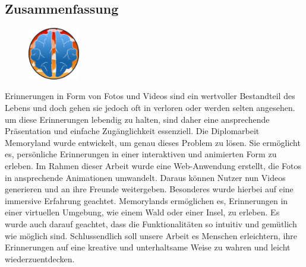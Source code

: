 \newpage
\begin{spacing}{1}
    \chapter*{Zusammenfassung}
\end{spacing}
\begin{figure}
    \begin{center}
      \includegraphics[width=0.2\textwidth]{pics/memoryland-logo.png}
    \end{center}
\end{figure}
Erinnerungen in Form von Fotos und Videos sind ein wertvoller Bestandteil des Lebens und doch
gehen sie jedoch oft in verloren oder werden selten angesehen. um diese Erinnerungen lebendig zu halten,
sind daher eine ansprechende Präsentation und einfache Zugänglichkeit essenziell.
\newline
Die Diplomarbeit Memoryland wurde entwickelt, um genau dieses Problem zu lösen. Sie ermöglicht es, 
persönliche Erinnerungen in einer interaktiven und animierten Form zu erleben. Im Rahmen dieser 
Arbeit wurde eine Web-Anwendung erstellt, die Fotos in ansprechende Animationen umwandelt. 
Daraus können Nutzer nun Videos generieren und an ihre Freunde weitergeben.
\newline
Besonderes wurde hierbei auf eine immersive Erfahrung geachtet. Memorylands ermöglichen es, 
Erinnerungen in einer virtuellen Umgebung, wie einem Wald oder einer Insel, zu erleben. Es
wurde auch darauf geachtet, dass die Funktionalitäten so intuitiv und gemütlich wie möglich
sind.
\newline
Schlussendlich soll unsere Arbeit es Menschen erleichtern, ihre Erinnerungen auf eine 
kreative und unterhaltsame Weise zu wahren und leicht wiederzuentdecken.

